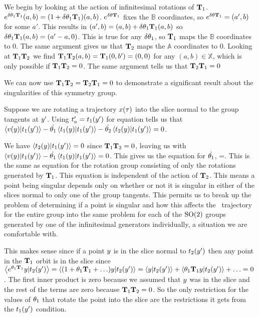{We begin by looking at the action of infinitesimal rotations of $\mathbf{T}_1$. $e^{\delta {\bf \theta}_1 \mathbf{T}_1}(a,b)=(1+\delta {\bf \theta}_1 \mathbf{T}_1) (a,b)$. $e^{\delta {\bf \theta} \mathbf{T}_1}$ fixes the $\mathbb{B}$ coordinates, so $e^{\delta {\bf \theta} \mathbf{T}_1}=(a',b)$ for some $a'$. This results in $(a',b)=(a,b)+\delta {\bf \theta}_1 \mathbf{T}_1(a,b)$ so $\delta {\bf \theta}_1 \mathbf{T}_1(a,b)=(a'-a,0)$. This is true for any $\delta {\bf \theta}_1$, so $\mathbf{T}_1$ maps the $\mathbb{B}$ coordinates to 0. The same argument gives us that $\mathbf{T}_2$ maps the $\mathbb{A}$ coordinates to 0. Looking at $\mathbf{T}_1 \mathbf{T}_2$ we find $\mathbf{T}_1 \mathbf{T}_2 (a,b)=\mathbf{T}_1 (0,b')=(0,0)$ for any $(a,b) \in \mathbb{X}$, which is only possible if $\mathbf{T}_1 \mathbf{T}_2=0$. The same argument tells us that $\mathbf{T}_2 \mathbf{T}_1=0$ %

We can now use $\mathbf{T}_1 \mathbf{T}_2=\mathbf{T}_2 \mathbf{T}_1=0$ to demonstrate a significant result about the singularities of this symmetry group.

Suppose we are rotating a trajectory $x(\tau)$ into the slice normal to the group tangents at ${y'}$. Using $t'_{a}=t_1({y'})$ for equation  tells us that
$\left\langle {\ensuremath{v}(\ensuremath{y})}|{t_1({y'})} \right\rangle-\dot{{\bf \theta}_1} \left\langle { \ensuremath{t}_1(\ensuremath{y})}|{t_1({y'})} \right\rangle-\dot{{\bf \theta}_2} \left\langle { \ensuremath{t}_2(\ensuremath{y})}|{t_1({y'})} \right\rangle=0$.

We have
$\left\langle {\ensuremath{t}_2(\ensuremath{y})}|{t_1({y'})} \right\rangle=0$ since $\mathbf{T}_1 \mathbf{T}_2=0$,
leaving us with $\left\langle {\ensuremath{v}(\ensuremath{y})}|{t_1({y'})} \right\rangle-\dot{{\bf \theta}_1}\left\langle {\ensuremath{t}_1(\ensuremath{y})}|{t_1({y'})} \right\rangle=0$. This gives us the equation for $\dot{{\bf \theta}_1}$,
\beq
{}=.
\eeq
This is the same as equation  for the rotation group consisting of only the rotations generated by $\mathbf{T}_1$. This equation is independent of the action of $\mathbf{T}_2$. This means a point being singular depends only on whether or not it is singular in either of the slices normal to only one of the group tangents. This permits us to break up the problem of determining if a point is singular and how this affects the \reducedsp\ trajectory for the entire group into the same problem for each of the $\textrm{SO}(2)$ groups generated by one of the infinitesimal generators individually, a situation we are comfortable with.

This makes sense since if a point $y$ is in the slice normal to $t_2({y'})$ then any point in the $\mathbf{T}_1$ orbit is in the slice since $\left\langle {e^{\ensuremath{{\bf \theta}}_1 \ensuremath{\mathbf{T}}_1}\ensuremath{y}}|{t_2({y'})} \right\rangle=\left\langle {(1+\ensuremath{{\bf \theta}}_1 \ensuremath{\mathbf{T}}_1+\ldots)\ensuremath{y}}|{t_2({y'})} \right\rangle=\left\langle {\ensuremath{y}}|{t_2({y'})} \right\rangle+\left\langle {\ensuremath{{\bf \theta}}_1 \ensuremath{\mathbf{T}}_1 \ensuremath{y}}|{t_2({y'})} \right\rangle+\ldots=0$. The first inner product is zero because we assumed that $y$ was in the slice and the rest of the terms are zero because $\mathbf{T}_1 \mathbf{T}_2=0$. So the only restriction for the values of ${\bf \theta}_1$ that rotate the point into the slice are the restrictions it gets from the $t_1({y'})$ condition.

}
